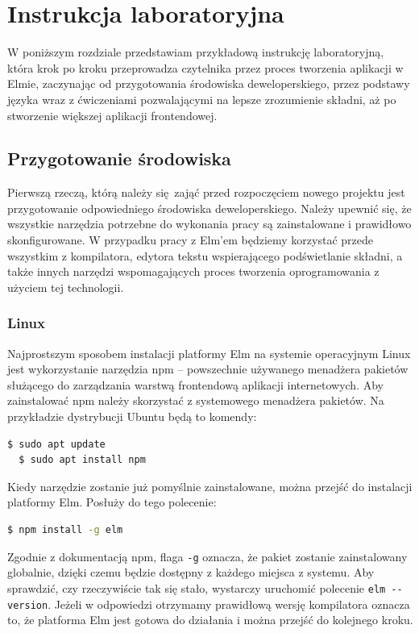 \documentclass[twoside,a4paper]{report}
\begin{document}

\chapter{Instrukcja laboratoryjna}
\lstset{frame=none}
W poniższym rozdziale przedstawiam przykładową instrukcję laboratoryjną, która krok po kroku przeprowadza czytelnika przez proces tworzenia aplikacji w Elmie, zaczynając od przygotowania środowiska deweloperskiego, przez podstawy języka wraz z ćwiczeniami pozwalającymi na lepsze zrozumienie składni, aż po stworzenie większej aplikacji frontendowej.

\section{Przygotowanie środowiska}
Pierwszą rzeczą, którą należy się zająć przed rozpoczęciem nowego projektu jest przygotowanie odpowiedniego środowiska deweloperskiego.
Należy upewnić się, że wszystkie narzędzia potrzebne do wykonania pracy są zainstalowane i prawidłowo skonfigurowane.
W przypadku pracy z Elm'em będziemy korzystać przede wszystkim z kompilatora, edytora tekstu wspierającego podświetlanie składni, a także innych narzędzi wspomagających proces tworzenia oprogramowania z użyciem tej technologii.

\subsection{Linux}
Najprostszym sposobem instalacji platformy Elm na systemie operacyjnym Linux jest wykorzystanie narzędzia npm -- powszechnie używanego menadżera pakietów służącego do zarządzania warstwą frontendową aplikacji internetowych.
Aby zainstalować npm należy skorzystać z systemowego menadżera pakietów.
Na przykładzie dystrybucji Ubuntu będą to komendy:
\begin{lstlisting}[language=bash]
  $ sudo apt update
  $ sudo apt install npm
\end{lstlisting}
Kiedy narzędzie zostanie już pomyślnie zainstalowane, można przejść do instalacji platformy Elm.
Posłuży do tego polecenie:
\begin{lstlisting}[language=bash]
  $ npm install -g elm
\end{lstlisting}
Zgodnie z dokumentacją npm\cite{npmdocs}, flaga \verb|-g| oznacza, że pakiet zostanie zainstalowany globalnie, dzięki czemu będzie dostępny z każdego miejsca z systemu.
Aby sprawdzić, czy rzeczywiście tak się stało, wystarczy uruchomić polecenie \verb|elm --version|.
Jeżeli w odpowiedzi otrzymamy prawidłową wersję kompilatora oznacza to, że platforma Elm jest gotowa do działania i można przejść do kolejnego kroku.
\end{document}
